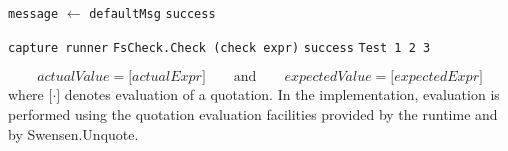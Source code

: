 \begin{algorithm}
\caption{Assertify.Test}
\begin{algorithmic}[0]
            \State\texttt{message} $\gets$ \texttt{defaultMsg}
        \EndIf
        \Try
                \State\Return\texttt{success}
            \Else
                \State\Return{}
            \EndIf
        \With
            \State\Return{}
    \EndFunction
\end{algorithmic}
\end{algorithm}


\begin{algorithm}
\caption{Checkify.Check}
\begin{algorithmic}[0]
        \State \texttt{capture runner}
        \Try
            \State\texttt{FsCheck.Check (check expr)}
            \State\Return\texttt{success}
            \State\texttt{Test 1 2 3}
    \EndFunction
\end{algorithmic}
\end{algorithm}





\vfill
\pagebreak

\improve
\pagebreak


%
\[
\textit{actualValue} = \lbrack \textit{actualExpr} \rbrack
\qquad\text{and}\qquad
\textit{expectedValue} = \lbrack \textit{expectedExpr} \rbrack
\]
%
where $\lbrack \cdot \rbrack$ denotes evaluation of a quotation. In the
implementation, evaluation is performed using the quotation evaluation facilities
provided by the \fs runtime and by Swensen.Unquote.

